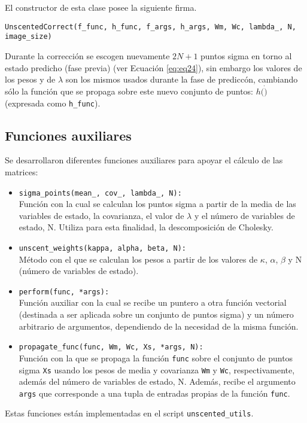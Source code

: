 El constructor de esta clase posee la siguiente firma.

\bigskip
\begin{center}
\texttt{UnscentedCorrect(f\_func, h\_func, f\_args, h\_args,  Wm, Wc, lambda\_, N, image\_size)}
\end{center}




Durante la correcci\'on se escogen nuevamente $2N+1$ puntos sigma en torno al estado predicho (fase previa) (ver Ecuaci\'on \ref{eq:eq24}), sin embargo los valores de los pesos y de $\lambda$ son los mismos usados durante la fase de predicc\'on, cambiando s\'olo la funci\'on que se propaga sobre este nuevo conjunto de puntos: $h(\dot)$ (expresada como \texttt{h\_func}). 
\bigskip

\subsection{Funciones auxiliares}
Se desarrollaron diferentes funciones auxiliares para apoyar el c\'alculo de las matrices:
\begin{itemize}
\item \texttt{sigma\_points(mean\_, cov\_, lambda\_, N):}\\
Funci\'on con la cual se calculan los puntos sigma a partir de la media de las variables de estado, la covarianza, el valor de $\lambda$ y el n\'umero de variables de estado, N. Utiliza para esta finalidad, la descomposici\'on de Cholesky.
\item \texttt{unscent\_weights(kappa, alpha, beta, N):}\\
M\'etodo con el que se calculan los pesos a partir de los valores de $\kappa$, $\alpha$, $\beta$ y N (n\'umero de variables de estado). 
\item \texttt{perform(func, *args):}\\
Funci\'on auxiliar con la cual se recibe un puntero a otra funci\'on vectorial (destinada a ser aplicada sobre un conjunto de puntos sigma) y un n\'umero arbitrario de argumentos, dependiendo de la necesidad de la misma funci\'on.
\item \texttt{propagate\_func(func, Wm, Wc, Xs, *args, N):}\\
Funci\'on con la que se propaga la funci\'on \texttt{func} sobre el conjunto de puntos sigma \texttt{Xs} usando los pesos de media y covarianza \texttt{Wm} y \texttt{Wc}, respectivamente, adem\'as del n\'umero de variables de estado, N. Adem\'as, recibe el argumento \texttt{args} que corresponde a una tupla de entradas propias de la funci\'on \texttt{func}. 
\end{itemize}

Estas funciones est\'an implementadas en el script \texttt{unscented\_utils}.
